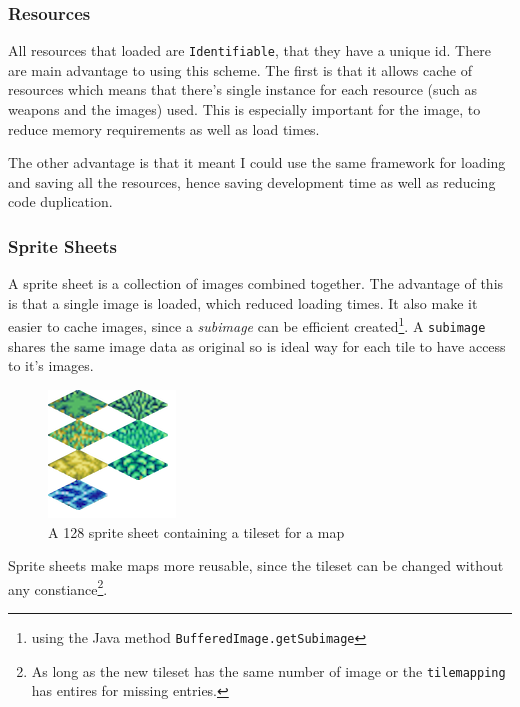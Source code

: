 
\subsubsection{Resources}

All resources that loaded are \texttt{Identifiable}, that they have a unique id.  There are main advantage to using this scheme. The first is that it allows cache of resources which means that there's single instance for each resource (such as weapons and the images) used. This is especially important for the image, to reduce memory requirements as well as load times.

The other advantage is that it meant I could use the same framework for loading and saving all the resources, hence saving development time as well as reducing code duplication. 


\subsubsection{Sprite Sheets}
\label{ssub:sprite_sheets}


A sprite sheet is a collection of images combined together. The advantage of this is that a single image is loaded, which reduced loading times. It also make it easier to cache images, since a \emph{subimage} can be efficient created\footnote{using the Java method \texttt{BufferedImage.getSubimage}}. A \texttt{subimage} shares the same image data as original so is ideal way for each tile to have access to it's images.    



\begin{figure}[htbp]
	\centering
		\includegraphics{figures/tileset.png}
	\caption{A 128 sprite sheet containing a tileset for a map}
	\label{fig:figures_tileset}
\end{figure}

Sprite sheets make maps more reusable, since the tileset can be changed without any constiance\footnote{As long as the new tileset has the same number of image or the \texttt{tilemapping} has entires for missing entries.}.  

